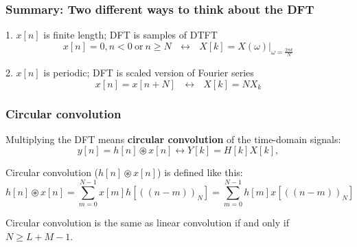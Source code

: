 \documentclass{beamer}
\begin{document}
\begin{frame}
  \frametitle{Summary: Two different ways to think about the DFT}
  \begin{block}{1. $x[n]$ is finite length; DFT is samples of DTFT}
    \begin{displaymath}
      x[n]=0,n<0~\text{or}~n\ge N~~~\leftrightarrow~~~X[k]=\left.X(\omega)\right|_{\omega=\frac{2\pi k}{N}}
    \end{displaymath}
  \end{block}
  \begin{block}{2. $x[n]$ is periodic; DFT is scaled version of Fourier series}
    \begin{displaymath}
      x[n]=x[n+N]~~~\leftrightarrow~~~X[k]=N X_k
    \end{displaymath}
  \end{block}
\end{frame}

\begin{frame}
  \frametitle{Circular convolution}

  Multiplying the DFT means {\bf circular convolution} of the time-domain signals:
  \begin{displaymath}
    y[n]=h[n]\circledast x[n] \leftrightarrow Y[k] = H[k]X[k],
  \end{displaymath}
  
  Circular convolution ($h[n]\circledast x[n]$) is defined like this:
  \begin{displaymath}
    h[n]\circledast x[n] = \sum_{m=0}^{N-1}x[m]h\left[(\!(n-m)\!)_N\right]
    = \sum_{m=0}^{N-1}h[m]x\left[(\!(n-m)\!)_N\right]
  \end{displaymath}

  Circular convolution is the same as linear convolution if and only if $N\ge L+M-1$.
\end{frame}
\end{document}
